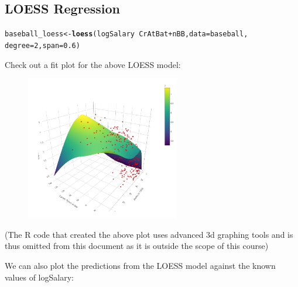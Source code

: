 \documentclass{article}\usepackage[]{graphicx}\usepackage[]{color}
\makeatletter
\newcommand{\hlnum}[1]{\textcolor[rgb]{0.686,0.059,0.569}{#1}}%
\newcommand{\hlopt}[1]{\textcolor[rgb]{0,0,0}{#1}}%
\newcommand{\hlstd}[1]{\textcolor[rgb]{0.345,0.345,0.345}{#1}}%
\newcommand{\hlkwb}[1]{\textcolor[rgb]{0.69,0.353,0.396}{#1}}%
\newcommand{\hlkwc}[1]{\textcolor[rgb]{0.333,0.667,0.333}{#1}}%
\newcommand{\hlkwd}[1]{\textcolor[rgb]{0.737,0.353,0.396}{\textbf{#1}}}%
\newenvironment{kframe}{%
 \def\at@end@of@kframe{}%
 \ifinner\ifhmode%
  \def\at@end@of@kframe{\end{minipage}}%
  \begin{minipage}{\columnwidth}%
 \fi\fi%
 \def\FrameCommand##1{\hskip\@totalleftmargin \hskip-\fboxsep
 \colorbox{shadecolor}{##1}\hskip-\fboxsep
     \hskip-\linewidth \hskip-\@totalleftmargin \hskip\columnwidth}%
 \MakeFramed {\advance\hsize-\width
   \@totalleftmargin\z@ \linewidth\hsize
   \@setminipage}}%
 {\par\unskip\endMakeFramed%
 \at@end@of@kframe}
\newenvironment{knitrout}{}{} %
\makeatother
\begin{document}
\newpage

\subsection*{LOESS Regression}

\begin{knitrout}
\color{fgcolor}\begin{kframe}
\begin{alltt}
\hlstd{baseball_loess} \hlkwb{<-} \hlkwd{loess}\hlstd{(logSalary} \hlopt{~} \hlstd{CrAtBat} \hlopt{+} \hlstd{nBB,} \hlkwc{data} \hlstd{= baseball,}
                        \hlkwc{degree} \hlstd{=} \hlnum{2}\hlstd{,} \hlkwc{span} \hlstd{=} \hlnum{0.6}\hlstd{)}
\end{alltt}
\end{kframe}
\end{knitrout}

Check out a fit plot for the above LOESS model:

\begin{figure}[H]
	\centering
	\includegraphics[width=0.6\textwidth]{4.3.1NonParReg_R_loessplot.png}
	\label{fig:myfig}
\end{figure}

(The R code that created the above plot uses advanced 3d graphing tools and is thus omitted from this document as it is outside the scope of this course)

We can also plot the predictions from the LOESS model against the known values of logSalary:
\end{document}
